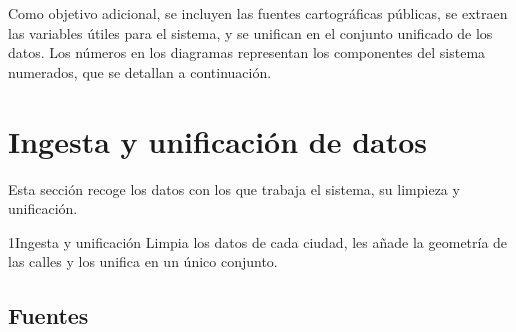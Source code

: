 Como objetivo adicional, se incluyen las fuentes cartográficas públicas, se extraen las variables útiles para el sistema, y se unifican en el conjunto unificado de los datos. Los números en los diagramas representan los componentes del sistema numerados, que se detallan a continuación.
\\

\section{Ingesta y unificación de datos}
\label{sec:arq-ingesta-unificacion-datos}

Esta sección recoge los datos con los que trabaja el sistema, su limpieza y unificación.
\\

\begin{fichacomponente}{1}{Ingesta y unificación}{}
  Limpia los datos de cada ciudad, les añade la geometría de las calles y los unifica en un único conjunto.
\end{fichacomponente}

\subsection{Fuentes}
\label{subsec:arq-fuentes-datos}

